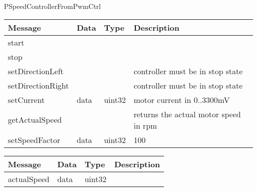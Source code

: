  {PSpeedControllerFromPwmCtrl}

\begin{tabular}[ht]{|l|l|l|p{8cm}|}
\hline
Message & Data & Type & Description\\
\hline
start &  &  & \\
\hline
stop &  &  & \\
\hline
setDirectionLeft &  &  & %
controller must be in stop state
\\
\hline
setDirectionRight &  &  & %
controller must be in stop state
\\
\hline
setCurrent &  data  &  uint32  & %
motor current in 0..3300mV 
\\
\hline
getActualSpeed &  &  & %
returns the actual motor speed in rpm
\\
\hline
setSpeedFactor &  data  &  uint32  & %
100%
\\
\hline
\end{tabular}
\begin{tabular}[ht]{|l|l|l|p{8cm}|}
\hline
Message & Data & Type & Description\\
\hline
actualSpeed &  data  &  uint32  & \\
\hline
\end{tabular}
